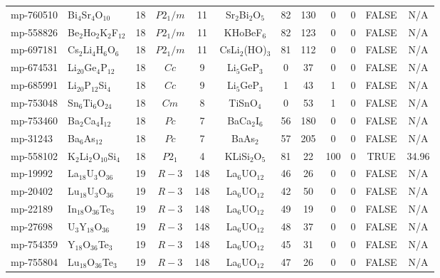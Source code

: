 {\begin{longtable}{llcccccccccc}
    mp-760510 & Bi$_{4}$Sr$_{4}$O$_{10}$ & 18    & $P2_1/m$ & 11    & Sr$_{2}$Bi$_{2}$O$_{5}$ & 82    & 130   & 0     & 0     & FALSE & N/A \\
    mp-558826 & Be$_{2}$Ho$_{2}$K$_{2}$F$_{12}$ & 18    & $P2_1/m$ & 11    & KHoBeF$_{6}$ & 82    & 123   & 0     & 0     & FALSE & N/A \\
    mp-697181 & Cs$_{2}$Li$_{4}$H$_{6}$O$_{6}$ & 18    & $P2_1/m$ & 11    & CsLi$_{2}$(HO)$_{3}$ & 81    & 112   & 0     & 0     & FALSE & N/A \\
    mp-674531 & Li$_{20}$Ge$_{4}$P$_{12}$ & 18    & $Cc$  & 9     & Li$_{5}$GeP$_{3}$ & 0     & 37    & 0     & 0     & FALSE & N/A \\
    mp-685991 & Li$_{20}$P$_{12}$Si$_{4}$ & 18    & $Cc$  & 9     & Li$_{5}$GeP$_{3}$ & 1     & 43    & 1     & 0     & FALSE & N/A \\
    mp-753048 & Sn$_{6}$Ti$_{6}$O$_{24}$ & 18    & $Cm$  & 8     & TiSnO$_{4}$ & 0     & 53    & 1     & 0     & FALSE & N/A \\
    mp-753460 & Ba$_{2}$Ca$_{4}$I$_{12}$ & 18    & $Pc$  & 7     & BaCa$_{2}$I$_{6}$ & 56    & 180   & 0     & 0     & FALSE & N/A \\
    mp-31243 & Ba$_{6}$As$_{12}$ & 18    & $Pc$  & 7     & BaAs$_{2}$ & 57    & 205   & 0     & 0     & FALSE & N/A \\
    mp-558102 & K$_{2}$Li$_{2}$O$_{10}$Si$_{4}$ & 18    & $P2_1$ & 4     & KLiSi$_{2}$O$_{5}$ & 81    & 22    & 100   & 0     & TRUE  & 34.96  \\
    mp-19992 & La$_{18}$U$_{3}$O$_{36}$ & 19    & $R-3$ & 148   & La$_{6}$UO$_{12}$ & 46    & 26    & 0     & 0     & FALSE & N/A \\
    mp-20402 & Lu$_{18}$U$_{3}$O$_{36}$ & 19    & $R-3$ & 148   & La$_{6}$UO$_{12}$ & 42    & 50    & 0     & 0     & FALSE & N/A \\
    mp-22189 & In$_{18}$O$_{36}$Te$_{3}$ & 19    & $R-3$ & 148   & La$_{6}$UO$_{12}$ & 49    & 19    & 0     & 0     & FALSE & N/A \\
    mp-27698 & U$_{3}$Y$_{18}$O$_{36}$ & 19    & $R-3$ & 148   & La$_{6}$UO$_{12}$ & 48    & 37    & 0     & 0     & FALSE & N/A \\
    mp-754359 & Y$_{18}$O$_{36}$Te$_{3}$ & 19    & $R-3$ & 148   & La$_{6}$UO$_{12}$ & 45    & 31    & 0     & 0     & FALSE & N/A \\
    mp-755804 & Lu$_{18}$O$_{36}$Te$_{3}$ & 19    & $R-3$ & 148   & La$_{6}$UO$_{12}$ & 47    & 26    & 0     & 0     & FALSE & N/A \\

\end{longtable}}
